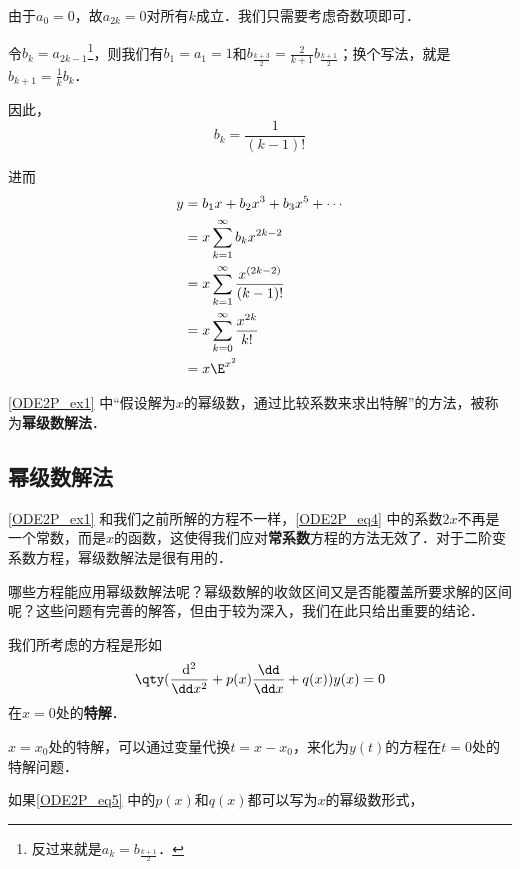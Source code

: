 \begin{example}{}
由于$a_0=0$，故$a_{2k}=0$对所有$k$成立．我们只需要考虑奇数项即可．

令$b_k=a_{2k-1}$\footnote{反过来就是$a_k=b_{\frac{k+1}{2}}$．}，则我们有$b_1=a_1=1$和$b_{\frac{k+3}{2}}=\frac{2}{k+1}b_{\frac{k+1}{2}}$；换个写法，就是$b_{k+1}=\frac{1}{k}b_k$．

因此，
\begin{equation}
b_k=\frac{1}{(k-1)!}
\end{equation}

进而
\begin{equation}
\begin{aligned}
y&=b_1x+b_2x^3+b_3x^5+\cdots\\
 &=x\sum\limits_{k=1}^\infty b_kx^{2k-2}\\
 &=x\sum\limits_{k=1}^\infty \frac{x^{(2k-2)}}{(k-1)!}\\
 &=x\sum\limits_{k=0}^\infty \frac{x^{2k}}{k!}\\
 &=x\E^{x^2} 
\end{aligned}
\end{equation}

\end{example}

\autoref{ODE2P_ex1} 中“假设解为$x$的幂级数，通过比较系数来求出特解”的方法，被称为\textbf{幂级数解法}．


\subsection{幂级数解法}

\autoref{ODE2P_ex1} 和我们之前所解的方程不一样，\autoref{ODE2P_eq4} 中的系数$2x$不再是一个常数，而是$x$的函数，这使得我们应对\textbf{常系数}方程的方法无效了．对于二阶变系数方程，幂级数解法是很有用的．

哪些方程能应用幂级数解法呢？幂级数解的收敛区间又是否能覆盖所要求解的区间呢？这些问题有完善的解答，但由于较为深入，我们在此只给出重要的结论．

我们所考虑的方程是形如
\begin{equation}\label{ODE2P_eq5}
\qty(\frac{\mathrm{d}^2}{\dd x^2}+p(x)\frac{\dd}{\dd x}+q(x))y(x)=0
\end{equation}
在$x=0$处的\textbf{特解}．

$x=x_0$处的特解，可以通过变量代换$t=x-x_0$，来化为$y(t)$的方程在$t=0$处的特解问题．

\begin{theorem}{}
如果\autoref{ODE2P_eq5} 中的$p(x)$和$q(x)$都可以写为$x$的幂级数形式，
\end{theorem}










